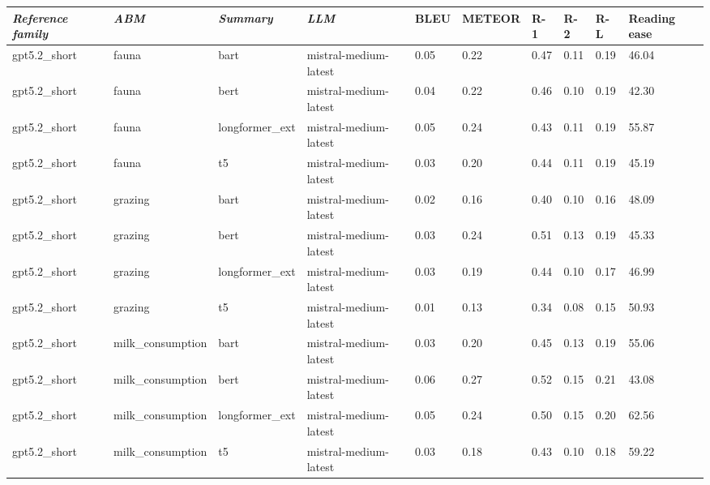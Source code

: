 \begin{tabular}{|l|l|l|l|l|l|l|l|l|l|}
\hline
\textit{\textbf{Reference family}} & \textit{\textbf{ABM}} & \textit{\textbf{Summary}} & \textit{\textbf{LLM}} & BLEU & METEOR & R-1 & R-2 & R-L & Reading ease \\
 \hline
 gpt5.2\_short & fauna & bart & mistral-medium-latest & 0.05 & 0.22 & 0.47 & 0.11 & 0.19 & 46.04 \\
 \hline
 gpt5.2\_short & fauna & bert & mistral-medium-latest & 0.04 & 0.22 & 0.46 & 0.10 & 0.19 & 42.30 \\
 \hline
 gpt5.2\_short & fauna & longformer\_ext & mistral-medium-latest & 0.05 & 0.24 & 0.43 & 0.11 & 0.19 & 55.87 \\
 \hline
 gpt5.2\_short & fauna & t5 & mistral-medium-latest & 0.03 & 0.20 & 0.44 & 0.11 & 0.19 & 45.19 \\
 \hline
 gpt5.2\_short & grazing & bart & mistral-medium-latest & 0.02 & 0.16 & 0.40 & 0.10 & 0.16 & 48.09 \\
 \hline
 gpt5.2\_short & grazing & bert & mistral-medium-latest & 0.03 & 0.24 & 0.51 & 0.13 & 0.19 & 45.33 \\
 \hline
 gpt5.2\_short & grazing & longformer\_ext & mistral-medium-latest & 0.03 & 0.19 & 0.44 & 0.10 & 0.17 & 46.99 \\
 \hline
 gpt5.2\_short & grazing & t5 & mistral-medium-latest & 0.01 & 0.13 & 0.34 & 0.08 & 0.15 & 50.93 \\
 \hline
 gpt5.2\_short & milk\_consumption & bart & mistral-medium-latest & 0.03 & 0.20 & 0.45 & 0.13 & 0.19 & 55.06 \\
 \hline
 gpt5.2\_short & milk\_consumption & bert & mistral-medium-latest & 0.06 & 0.27 & 0.52 & 0.15 & 0.21 & 43.08 \\
 \hline
 gpt5.2\_short & milk\_consumption & longformer\_ext & mistral-medium-latest & 0.05 & 0.24 & 0.50 & 0.15 & 0.20 & 62.56 \\
 \hline
 gpt5.2\_short & milk\_consumption & t5 & mistral-medium-latest & 0.03 & 0.18 & 0.43 & 0.10 & 0.18 & 59.22 \\
\hline
\end{tabular}
